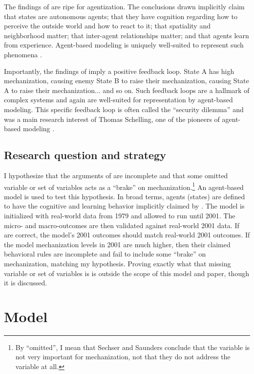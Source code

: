 \documentclass{article}
\begin{document}
The findings of \citet{sechser2010army} are ripe for agentization. The
conclusions drawn implicitly claim
that states are autonomous agents; that they have
cognition regarding how to perceive the outside world
and how to react to it; that spatiality and
neighborhood matter; that inter-agent relationships matter; and that
agents learn from experience. Agent-based modeling is uniquely well-suited to
represent such phenomena \citep{gilbert2005simulation,miller2009complex}.

Importantly, the findings of \citet{sechser2010army} imply a positive feedback
loop. State A has high
mechanization, causing enemy State B to raise their mechanization, causing State
A to raise their mechanization... and so on. Such feedback loops are a hallmark
of complex systems and again are well-suited for representation by agent-based
modeling. This specific feedback loop is often called
the ``security dilemma'' and was a main research interest of Thomas Schelling, one of the pioneers
of agent-based modeling \citep{schelling1960strategy,schelling2006micromotives}.

\subsection{Research question and strategy}

I hypothesize that the arguments of \citet{sechser2010army} are incomplete and
that some omitted variable or set of variables acts as a ``brake'' on 
mechanization.\footnote{By ``omitted'', I mean that Sechser and Saunders conclude that the variable
is not very important for mechanization, not that they do not address the
variable at all.} An agent-based model is used to test this hypothesis. In broad
terms, agents (states) are defined to have the cognitive and learning behavior
implicitly claimed by \citet{sechser2010army}. The model is initialized with
real-world data from 1979 and allowed to run until 2001. The micro- and
macro-outcomes are then validated against real-world 2001 data. If
\citet{sechser2010army} are correct, the model's 2001 outcomes should match
real-world 2001 outcomes. If the model mechanization levels in 2001 are much
higher, then their claimed behavioral rules are incomplete and fail to include
some ``brake'' on mechanization, matching my hypothesis. Proving exactly what
that missing variable or set of variables is is outside the scope of this model
and paper, though it is discussed.

\section{Model}
\end{document}

